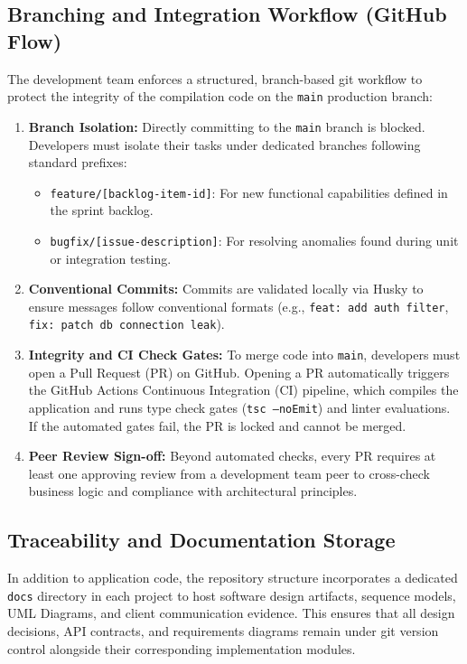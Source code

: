 \documentclass[letterpaper%
, oneside%
, 12pt%
, memoireprojet%
, english%
,creativecommons,hyperref, withAlgo2e %
]{thETS}
\begin{document}
\subsection{Branching and Integration Workflow (GitHub Flow)}
The development team enforces a structured, branch-based git workflow to protect the integrity of the compilation code on the \texttt{main} production branch:

\begin{enumerate}
    \item \textbf{Branch Isolation:} Directly committing to the \texttt{main} branch is blocked. Developers must isolate their tasks under dedicated branches following standard prefixes:
    \newline
    \begin{itemize}
        \item \texttt{feature/[backlog-item-id]}: For new functional capabilities defined in the sprint backlog.
        \item \texttt{bugfix/[issue-description]}: For resolving anomalies found during unit or integration testing.
    \end{itemize}

    \item \textbf{Conventional Commits:} Commits are validated locally via Husky to ensure messages follow conventional formats (e.g., \texttt{feat: add auth filter}, \texttt{fix: patch db connection leak}).

    \item \textbf{Integrity and CI Check Gates:} To merge code into \texttt{main}, developers must open a Pull Request (PR) on GitHub. Opening a PR automatically triggers the GitHub Actions Continuous Integration (CI) pipeline, which compiles the application and runs type check gates (\texttt{tsc --noEmit}) and linter evaluations. If the automated gates fail, the PR is locked and cannot be merged.

    \item \textbf{Peer Review Sign-off:} Beyond automated checks, every PR requires at least one approving review from a development team peer to cross-check business logic and compliance with architectural principles.
\end{enumerate}

\subsection{Traceability and Documentation Storage}
In addition to application code, the repository structure incorporates a dedicated \texttt{docs} directory in each project to host software design artifacts, sequence models, UML Diagrams, and client communication evidence. This ensures that all design decisions, API contracts, and requirements diagrams remain under git version control alongside their corresponding implementation modules.
\end{document}
